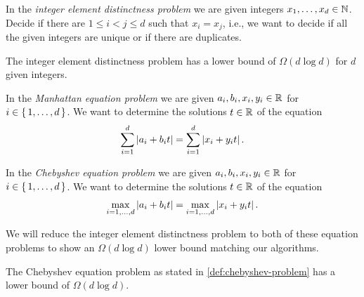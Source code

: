\begin{definition}
  In the \emph{integer element distinctness problem} we are given integers \(x_1, \dots, x_d \in \mathbb{N}\). Decide if there are \(1 \leq i < j \leq d\) such that \(x_i = x_j\), i.e., we want to decide if all the given integers are unique or if there are duplicates.
\end{definition}

\begin{theorem}
	The integer element distinctness problem has a lower bound of \(\Omega(d \log d)\) for \(d\) given integers. 
\end{theorem}

\begin{definition}\label{def:manhattan-problem}
	In the \emph{Manhattan equation problem} we are given \(a_i, b_i, x_i, y_i \in \mathbb{R}\) for \(i \in \set{1, \dots, d}\). We want to determine the solutions \(t \in \mathbb{R}\) of the equation 
	\begin{equation}
		\sum_{i=1}^d \left|a_i + b_i t\right| = \sum_{i=1}^d \left|x_i + y_i t\right|.
	\end{equation}
\end{definition}

\begin{definition}\label{def:chebyshev-problem}
	In the \emph{Chebyshev equation problem} we are given \(a_i, b_i, x_i, y_i \in \mathbb{R}\) for \(i \in \set{1, \dots, d}\). We want to determine the solutions \(t \in \mathbb{R}\) of the equation 
	\begin{equation}
		\max_{i=1, \dots, d} \left|a_i + b_i t\right| = \max_{i=1,\dots, d} \left|x_i + y_i t\right|.
	\end{equation}
\end{definition}

We will reduce the integer element distinctness problem to both of these equation problems to show an \(\Omega(d \log d)\) lower bound matching our algorithms. 

\begin{lemma}
	The Chebyshev equation problem as stated in \cref{def:chebyshev-problem} has a lower bound of \(\Omega(d \log d)\).
\end{lemma}

